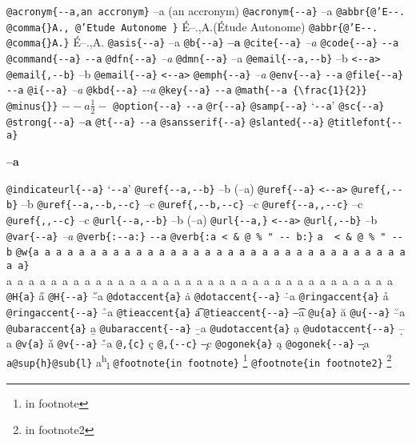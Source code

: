\documentclass{book}
\begin{document}
\texttt{@acronym\{{-}{-}a,an accronym\}} --a (an accronym)
\texttt{@acronym\{{-}{-}a\}} --a
\texttt{@abbr\{@'E{-}{-}. @comma\{\}A., @'Etude Autonome \}} \'{E}--.\@ ,A.\@ (\'{E}tude Autonome)
\texttt{@abbr\{@'E{-}{-}. @comma\{\}A.\}} \'{E}--.\@ ,A.\@
\texttt{@asis\{{-}{-}a\}} --a
\texttt{@b\{{-}{-}a\}} \textbf{--a}
\texttt{@cite\{{-}{-}a\}} \textit{--a}
\texttt{@code\{{-}{-}a\}} \texttt{{-}{-}a}
\texttt{@command\{{-}{-}a\}} \texttt{{-}{-}a}
\texttt{@dfn\{{-}{-}a\}} \emph{--a}
\texttt{@dmn\{{-}{-}a\}} --a
\texttt{@email\{{-}{-}a,{-}{-}b\}} --b \texttt{<{-}{-}a>}
\texttt{@email\{,{-}{-}b\}} --b
\texttt{@email\{{-}{-}a\}} \texttt{<{-}{-}a>}
\texttt{@emph\{{-}{-}a\}} \emph{--a}
\texttt{@env\{{-}{-}a\}} \texttt{{-}{-}a}
\texttt{@file\{{-}{-}a\}} \texttt{{-}{-}a}
\texttt{@i\{{-}{-}a\}} \textit{--a}
\texttt{@kbd\{{-}{-}a\}} {\ttfamily\textsl{{-}{-}a}}
\texttt{@key\{{-}{-}a\}} \texttt{{-}{-}a}
\texttt{@math\{{-}{-}a \{\textbackslash{}frac\{1\}\{2\}\} @minus\{\}\}} $--a {\frac{1}{2}} -$
\texttt{@option\{{-}{-}a\}} \texttt{{-}{-}a}
\texttt{@r\{{-}{-}a\}} 
\texttt{@samp\{{-}{-}a\}} `\texttt{{-}{-}a}'
\texttt{@sc\{{-}{-}a\}} 
\texttt{@strong\{{-}{-}a\}} \textbf{--a}
\texttt{@t\{{-}{-}a\}} \texttt{{-}{-}a}
\texttt{@sansserif\{{-}{-}a\}} 
\texttt{@slanted\{{-}{-}a\}} 
\texttt{@titlefont\{{-}{-}a\}} 

{\Huge \bfseries --a

}
\texttt{@indicateurl\{{-}{-}a\}} `\texttt{{-}{-}a}'
\texttt{@uref\{{-}{-}a,{-}{-}b\}} --b (--a)
\texttt{@uref\{{-}{-}a\}} \texttt{<{-}{-}a>}
\texttt{@uref\{,{-}{-}b\}} --b
\texttt{@uref\{{-}{-}a,{-}{-}b,{-}{-}c\}} --c
\texttt{@uref\{,{-}{-}b,{-}{-}c\}} --c
\texttt{@uref\{{-}{-}a,,{-}{-}c\}} --c
\texttt{@uref\{,,{-}{-}c\}} --c
\texttt{@url\{{-}{-}a,{-}{-}b\}} --b (--a)
\texttt{@url\{{-}{-}a,\}} \texttt{<{-}{-}a>}
\texttt{@url\{,{-}{-}b\}} --b
\texttt{@var\{{-}{-}a\}} \emph{--a}
\texttt{@verb\{:{-}{-}a:\}} \verb:--a:
\texttt{@verb\{:a  < \& @ \% " {-}{-}    b:\}} \verb:a  < & @ % " --    b:
\texttt{@w\{a a a a a a a a a a a a a a a a a a a a a a a a a a a a a a a a a a a\}} \hbox{a a a a a a a a a a a a a a a a a a a a a a a a a a a a a a a a a a a}
\texttt{@H\{a\}} \H{a}
\texttt{@H\{{-}{-}a\}} \H{--a}
\texttt{@dotaccent\{a\}} \.{a}
\texttt{@dotaccent\{{-}{-}a\}} \.{--a}
\texttt{@ringaccent\{a\}} \r{a}
\texttt{@ringaccent\{{-}{-}a\}} \r{--a}
\texttt{@tieaccent\{a\}} \t{a}
\texttt{@tieaccent\{{-}{-}a\}} \t{--a}
\texttt{@u\{a\}} \u{a}
\texttt{@u\{{-}{-}a\}} \u{--a}
\texttt{@ubaraccent\{a\}} \b{a}
\texttt{@ubaraccent\{{-}{-}a\}} \b{--a}
\texttt{@udotaccent\{a\}} \d{a}
\texttt{@udotaccent\{{-}{-}a\}} \d{--a}
\texttt{@v\{a\}} \v{a}
\texttt{@v\{{-}{-}a\}} \v{--a}
\texttt{@,\{c\}} \c{c}
\texttt{@,\{{-}{-}c\}} \c{--c}
\texttt{@ogonek\{a\}} \k{a}
\texttt{@ogonek\{{-}{-}a\}} \k{--a}
\texttt{a@sup\{h\}@sub\{l\}} a\textsuperscript{h}\textsubscript{l}
\texttt{@footnote\{in footnote\}} \footnote{in footnote

}
\texttt{@footnote\{in footnote2\}} \footnote{in footnote2

}
\end{document}

